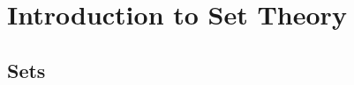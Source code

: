 \documentclass{book}
\begin{document}
	
	
	
	
	
	
	
	
	
	
	
	
	
	
	
	
	
	
	
	
	
	
	\newpage
	
	\chapter{Introduction to Set Theory}
	
	\section{Sets}	
	
\end{document}

